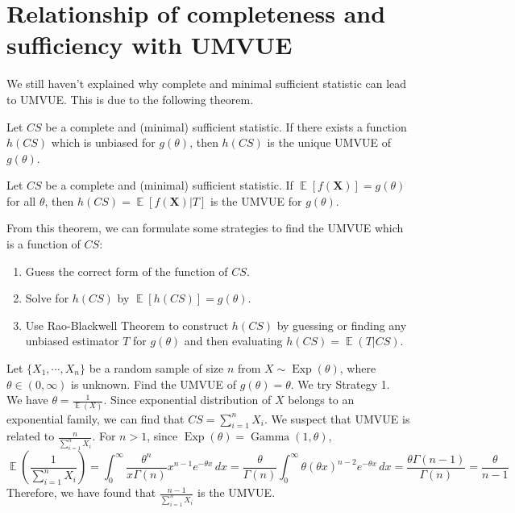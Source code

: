 \documentclass{huhtakm-template-book-v2}
\DeclareMathOperator{\E}{\mathbb{E}}
\DeclareMathOperator{\Exp}{Exp}
\DeclareMathOperator{\Gam}{Gamma}
\begin{document}
\section{Relationship of completeness and sufficiency with UMVUE}
We still haven't explained why complete and minimal sufficient statistic can lead to UMVUE. This is due to the following theorem.
\begin{thm} Let $CS$ be a complete and (minimal) sufficient statistic. If there exists a function $h(CS)$ which is unbiased for $g(\theta)$, then $h(CS)$ is the unique UMVUE of $g(\theta)$.
\end{thm}
\begin{thm}
	Let $CS$ be a complete and (minimal) sufficient statistic. If $\E[f(\mathbf{X})]=g(\theta)$ for all $\theta$, then $h(CS)=\E[f(\mathbf{X})|T]$ is the UMVUE for $g(\theta)$.
\end{thm}
\begin{rem}
	From this theorem, we can formulate some strategies to find the UMVUE which is a function of $CS$:
	\begin{enumerate}
		\item Guess the correct form of the function of $CS$.
		\item Solve for $h(CS)$ by $\E[h(CS)]=g(\theta)$.
		\item Use Rao-Blackwell Theorem to construct $h(CS)$ by guessing or finding any unbiased estimator $T$ for $g(\theta)$ and then evaluating $h(CS)=\E(T|CS)$.
	\end{enumerate}
\end{rem}
\begin{eg}
	\label{Chapter 3 (Example) UMVUE of Exp(theta)}
	Let $\{X_{1},\cdots,X_{n}\}$ be a random sample of size $n$ from $X\sim\Exp(\theta)$, where $\theta\in(0,\infty)$ is unknown. Find the UMVUE of $g(\theta)=\theta$. We try Strategy 1.\\
	We have $\theta=\frac{1}{\E(X)}$. Since exponential distribution of $X$ belongs to an exponential family, we can find that $CS=\sum_{i=1}^{n}X_{i}$. We suspect that UMVUE is related to $\frac{n}{\sum_{i=1}^{n}X_{i}}$. For $n>1$, since $\Exp(\theta)=\Gam(1,\theta)$,
	\begin{equation*}
		\E\left(\frac{1}{\sum_{i=1}^{n}X_{i}}\right)=\int_{0}^{\infty}\frac{\theta^{n}}{x\Gamma(n)}x^{n-1}e^{-\theta x}\,dx=\frac{\theta}{\Gamma(n)}\int_{0}^{\infty}\theta(\theta x)^{n-2}e^{-\theta x}\,dx=\frac{\theta\Gamma(n-1)}{\Gamma(n)}=\frac{\theta}{n-1}
	\end{equation*}
	Therefore, we have found that $\frac{n-1}{\sum_{i=1}^{n}X_{i}}$ is the UMVUE.
\end{eg}
\end{document}
